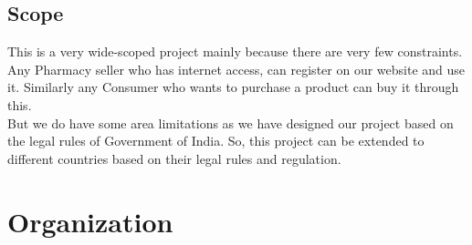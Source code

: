\documentclass[
10pt, %
a4paper, %
oneside, %
headinclude,footinclude, %
BCOR5mm, %
]{scrartcl}
\begin{document}

\subsection{Scope}
This is a very wide-scoped project mainly because there are very few constraints. Any Pharmacy seller who has internet access, can register on our website and use it. Similarly any Consumer who wants to purchase a product can buy it through this.
\\
But we do have some area limitations as we have designed our project based on the legal rules of Government of India. So, this project can be extended to different countries based on their legal rules and regulation. 

\section{Organization}
\end{document}
